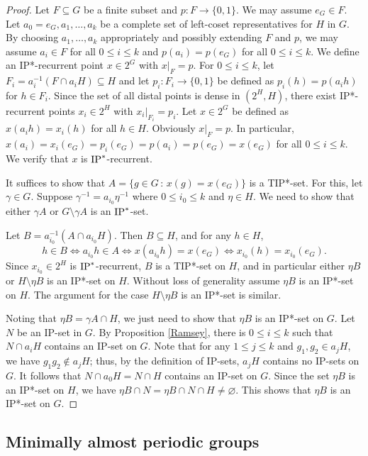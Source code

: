 \documentclass[11pt]{amsart}
\theoremstyle{definition}
\numberwithin{equation}{section}
\theoremstyle{definition}
\begin{document}
\begin{proof} Let $F\subseteq G$ be a finite subset and $p: F\to \{0,1\}$. We may assume $e_G\in F$. Let $a_0=e_G, a_1, \dots, a_k$ be a complete set of left-coset representatives for $H$ in $G$. By choosing $a_1,\dots, a_k$ appropriately and possibly extending $F$ and $p$, we may assume $a_i\in F$ for all $0\leq i\leq k$ and $p(a_i)=p(e_G)$ for all $0\leq i\leq k$. We define an IP*-recurrent point $x\in 2^G$ with $x|_F=p$. For $0\leq i\leq k$, let $F_i=a_i^{-1}(F\cap a_iH)\subseteq H$ and let $p_i: F_i\to \{0,1\}$ be defined as $p_i(h)=p(a_ih)$ for $h\in F_i$. Since the set of all distal points is dense in $(2^H, H)$, there exist IP*-recurrent points $x_i\in 2^H$ with $x_i|_{F_i}=p_i$. Let $x\in 2^G$ be defined as $x(a_ih)=x_i(h)$ for all $h\in H$. Obviously $x|_{F}=p$. In particular, $x(a_i)=x_i(e_G)=p_i(e_G)=p(a_i)=p(e_G)=x(e_G)$ for all $0\leq i\leq k$. We verify that $x$ is ${\rm IP}^*$-recurrent.

It suffices to show that $A=\{g\in G\,:\, x(g)=x(e_G)\}$ is a TIP*-set. For this, let $\gamma\in G$. Suppose $\gamma^{-1}=a_{i_0}\eta^{-1}$ where $0\leq i_0\leq k$ and $\eta\in H$. We need to show that either $\gamma A$ or $G\setminus \gamma A$ is an ${\rm IP}^*$-set.

Let $B=a_{i_0}^{-1}(A\cap a_{i_0}H)$. Then $B\subseteq H$, and for any $h\in H$,
$$ h\in B\iff a_{i_0}h\in A \iff x(a_{i_0}h)=x(e_G) \iff x_{i_0}(h)=x_{i_0}(e_G). $$
Since $x_{i_0}\in 2^H$ is ${\rm IP}^*$-recurrent, $B$ is a TIP*-set on $H$, and in particular either $\eta B$ or $H\setminus \eta B$ is an IP*-set on $H$. Without loss of generality assume $\eta B$ is an IP*-set on $H$. The argument for the case $H\setminus \eta B$ is an IP*-set is similar.

Noting that $\eta B=\gamma A\cap H$, we just need to show that $\eta B$ is an IP*-set on $G$. Let $N$ be an IP-set in $G$. By Proposition \ref{Ramsey}, there is $0\le i\le k$ such that $N\cap a_iH$ contains an IP-set on $G$. Note that for any $1\le j\le k$ and $g_1,g_2\in a_jH$, we have $g_1g_2\notin a_jH$; thus, by the definition of IP-sets, $a_jH$ contains no IP-sets on $G$. It follows that $N\cap a_0H=N\cap H$ contains an IP-set on $G$. Since the set $\eta B$ is an IP*-set on $H$, we have $\eta B\cap N=\eta B\cap N\cap H\ne\varnothing$. This shows that $\eta B$ is an IP*-set on $G$. 
\end{proof}

\subsection{Minimally almost periodic groups}\hfill
\end{document}
